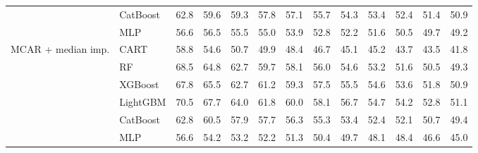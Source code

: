 \begin{table}[p]
\begin{tabular}{@{}llrrrrrrrrrrr@{}}
 & CatBoost & 62.8 & 59.6 & 59.3 & 57.8 & 57.1 & 55.7 & 54.3 & 53.4 & 52.4 & 51.4 & 50.9 \\
 & MLP & 56.6 & 56.5 & 55.5 & 55.0 & 53.9 & 52.8 & 52.2 & 51.6 & 50.5 & 49.7 & 49.2 \\
\midrule
MCAR + median imp. & CART & 58.8 & 54.6 & 50.7 & 49.9 & 48.4 & 46.7 & 45.1 & 45.2 & 43.7 & 43.5 & 41.8 \\
 & RF & 68.5 & 64.8 & 62.7 & 59.7 & 58.1 & 56.0 & 54.6 & 53.2 & 51.6 & 50.5 & 49.3 \\
 & XGBoost & 67.8 & 65.5 & 62.7 & 61.2 & 59.3 & 57.5 & 55.5 & 54.6 & 53.6 & 51.8 & 50.9 \\
 & LightGBM & 70.5 & 67.7 & 64.0 & 61.8 & 60.0 & 58.1 & 56.7 & 54.7 & 54.2 & 52.8 & 51.1 \\
 & CatBoost & 62.8 & 60.5 & 57.9 & 57.7 & 56.3 & 55.3 & 53.4 & 52.4 & 52.1 & 50.7 & 49.4 \\
 & MLP & 56.6 & 54.2 & 53.2 & 52.2 & 51.3 & 50.4 & 49.7 & 48.1 & 48.4 & 46.6 & 45.0 \\
\bottomrule
\end{tabular}
\end{table}

